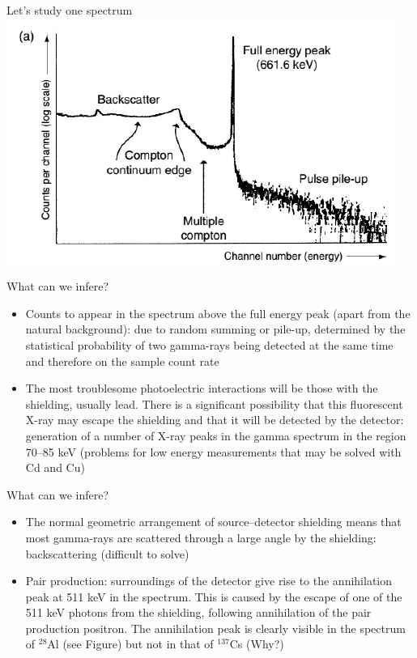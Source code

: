 \begin{frame}[allowframebreaks]{Let's study one spectrum}
\centering
\includegraphics[scale=0.6]{figures/gammaspecexample.png}


\begin{exampleblock}{What can we infere?}

{\small
\begin{itemize}
\item Counts to appear in the spectrum above the full energy peak (apart from the natural background): due to random summing or pile-up, determined by the statistical probability of two gamma-rays being detected at the same time and therefore on the sample count rate 
\item The most troublesome photoelectric interactions will be those with the shielding, usually lead. There is a significant possibility that this fluorescent X-ray may escape the shielding and that it will be detected by the detector: generation of a number of X-ray peaks in the gamma spectrum in the region 70–85 keV (problems for low energy measurements that may be solved with Cd and Cu) 
\end{itemize}
}
\end{exampleblock}

\begin{exampleblock}{What can we infere?}

{\small
\begin{itemize}
\item The normal geometric arrangement of source–detector shielding means that most gamma-rays are scattered through a large angle by the shielding: backscattering (difficult to solve)
\item Pair production: surroundings of the detector give rise to the annihilation peak at 511 keV in the spectrum. This is caused by the escape of one of the 511 keV photons from the shielding, following annihilation of the pair production positron. The annihilation peak is clearly visible in the spectrum of $^{28}$Al (see Figure) but not in that of $^{137}$Cs \alert{(Why?})
\end{itemize}
}
\end{exampleblock}




\end{frame}
